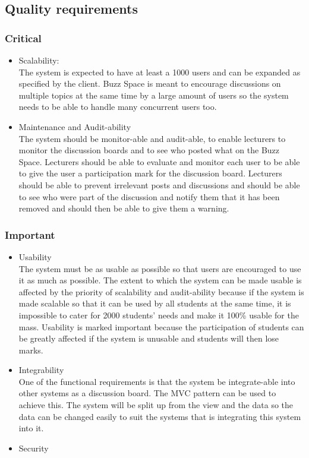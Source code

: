 
\subsection{Quality requirements}
	\subsubsection{Critical}
		\begin{itemize}
			\item Scalability: \\
			The system is expected to have at least a 1000 users and can be expanded as specified by the client. Buzz Space is meant to encourage discussions on multiple topics at the same time by a large amount of users so the system needs to be able to handle many concurrent users too.
			\item Maintenance and Audit-ability \\
			The system should be monitor-able and audit-able, to enable lecturers to monitor the discussion boards and to see who posted what on the Buzz Space. Lecturers should be able to evaluate and monitor each user to be able to give the user a participation mark for the discussion board. Lecturers should be able to prevent irrelevant posts and discussions and should be able to see who were part of the discussion and notify them that it has been removed and should then be able to give them a warning.
		\end{itemize}
	\subsubsection{Important}
		\begin{itemize}
			\item Usability \\
			The system must be as usable as possible so that users are encouraged to use it as much as possible. The extent to which the system can be made usable is affected by the priority of scalability and audit-ability because if the system is made scalable so that it can be used by all students at the same time, it is impossible to cater for 2000 students' needs and make it 100\% usable for the mass. Usability is marked important because the participation of students can be greatly affected if the system is unusable and students will then lose marks.

			\item Integrability\\
			One of the functional requirements is that the system be integrate-able into other systems as a discussion board. The MVC pattern can be used to achieve this. The system will be split up from the view and the data so the data can be changed easily to suit the systems that is integrating this system into it.
			
			\item Security
		\end{itemize}